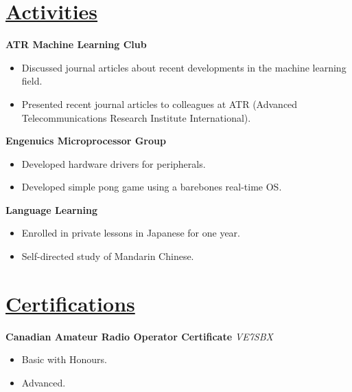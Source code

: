 \documentclass[a4paper, 11pt]{article}
\begin{document}
\section{\underline{Activities}}
  \textbf{ATR Machine Learning Club}
  \begin{itemize}[nosep]
    \item Discussed journal articles about recent developments in the machine learning field.
    \item Presented recent journal articles to colleagues at ATR (Advanced Telecommunications Research Institute International).
  \end{itemize}
  \medskip
      
  \textbf{Engenuics Microprocessor Group}
  \begin{itemize}[nosep]
    \item Developed hardware drivers for peripherals.
    \item Developed simple pong game using a barebones real-time OS.
  \end{itemize}
  \medskip
      
  \textbf{Language Learning}
  \begin{itemize}[nosep]
    \item Enrolled in private lessons in Japanese for one year.
    \item Self-directed study of Mandarin Chinese.
  \end{itemize}

\section{\underline{Certifications}}
  \textbf{Canadian Amateur Radio Operator Certificate}
  \hfill
  \emph{VE7SBX}
  \begin{itemize}[nosep]
    \item Basic with Honours.
    \item Advanced.
  \end{itemize}
\end{document}
